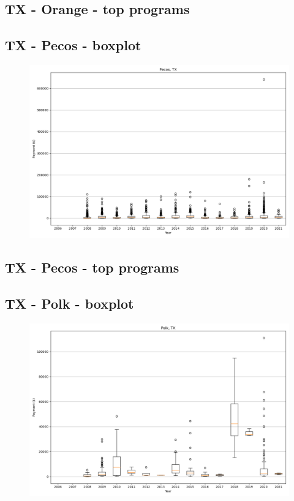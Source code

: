 \subsection*{TX - Orange - top programs}

\newpage
\subsection*{TX - Pecos - boxplot}
\begin{figure}[h]
\centering
\includegraphics[width=7in]{../output/boxplots/counties/Pecos-TX_boxplot.png}
\end{figure}


\subsection*{TX - Pecos - top programs}

\newpage
\subsection*{TX - Polk - boxplot}
\begin{figure}[h]
\centering
\includegraphics[width=7in]{../output/boxplots/counties/Polk-TX_boxplot.png}
\end{figure}


